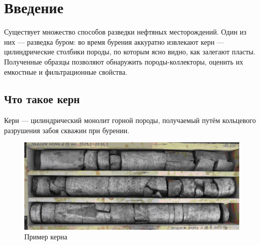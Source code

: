 \documentclass[14pt]{matmex-diploma}
\begin{document}

\maketitle

\tableofcontents


\section*{Введение}

    Существует множество способов разведки нефтяных месторождений. Один из них — разведка буром: во время бурения аккуратно извлекают керн — цилиндрические столбики породы, по которым ясно видно, как залегают пласты. Полученные образцы позволяют обнаружить породы-коллекторы, оценить их емкостные и фильтрационные свойства.
    
    \subsection*{Что такое керн}
    
        Керн — цилиндрический монолит горной породы, получаемый путём кольцевого разрушения забоя скважин при бурении.
        
        \begin{figure}[h]
            \label{керн}
            \centering
            \includegraphics[scale=0.5]{images/kern.jpg}
            \caption{Пример керна}
        \end{figure}
        
\end{document}
